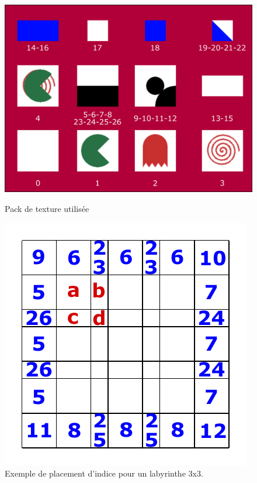 \begin{figure}[!ht]
\begin{minipage}{.48\textwidth}
\centering
\vfill%
\includegraphics[width = .98\textwidth]{./4_Verifications/texture.pdf}
\caption{\label{fig:texture}Pack de texture utilisée}\vfill%
\end{minipage}\hfill%
\begin{minipage}{.48\textwidth}
\centering
\vfill%
\includegraphics[width = .98\textwidth]{./4_Verifications/matriceTexture.pdf}
\caption{\label{fig:matTextu}Exemple de placement d'indice pour un labyrinthe 3x3.}\vfill%
\end{minipage}
\end{figure}
